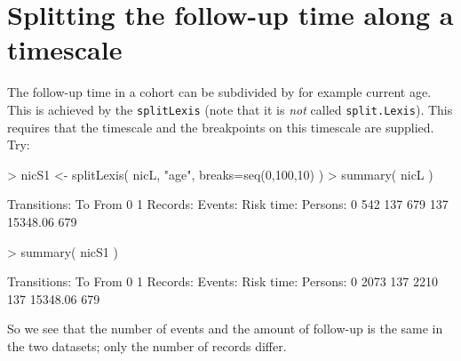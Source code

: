 \documentclass[a4paper,twoside,12pt]{article}
\begin{document}
\section{Splitting the follow-up time along a timescale}

The follow-up time in a cohort can be subdivided by for example
current age. This is achieved by the \texttt{splitLexis} (note that it
is \emph{not} called \texttt{split.Lexis}). This requires that the
timescale and the breakpoints on this timescale are supplied. Try:
\begin{Schunk}
\begin{Sinput}
> nicS1 <- splitLexis( nicL, "age", breaks=seq(0,100,10) )
> summary( nicL )
\end{Sinput}
\begin{Soutput}
Transitions:
     To
From   0   1  Records:  Events: Risk time:  Persons:
   0 542 137       679      137   15348.06       679
\end{Soutput}
\begin{Sinput}
> summary( nicS1 )
\end{Sinput}
\begin{Soutput}
Transitions:
     To
From    0   1  Records:  Events: Risk time:  Persons:
   0 2073 137      2210      137   15348.06       679
\end{Soutput}
\end{Schunk}
So we see that the number of events and the amount of follow-up is the
same in the two datasets; only the number of records differ.
\end{document}

